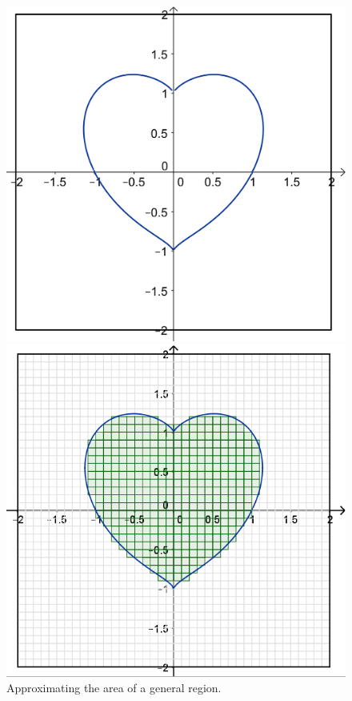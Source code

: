 \begin{figure}
\centering
    \begin{minipage}{0.3\textwidth}
        \centering
	\includegraphics[width=0.85\linewidth]{fig/4_heart.png}
    \end{minipage}%
    \begin{minipage}{0.3\textwidth}
        \centering
	\includegraphics[width=0.85\linewidth]{fig/4_heart_sq.png}
    \end{minipage}	
    \caption{Approximating the area of a general region. \label{fig:4_heart}}
\end{figure}



